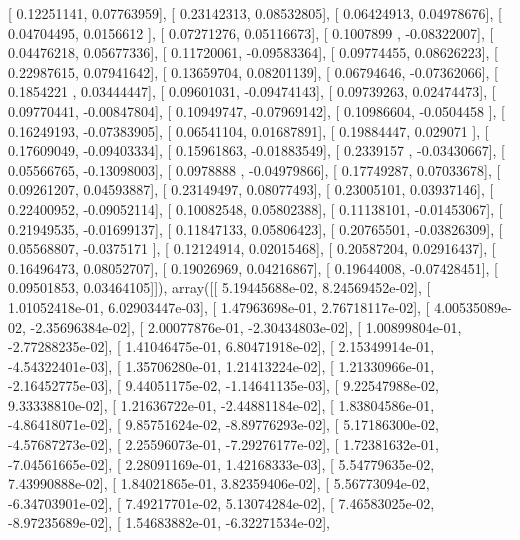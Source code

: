 \documentclass{article}
\begin{document}
       [ 0.12251141,  0.07763959],
       [ 0.23142313,  0.08532805],
       [ 0.06424913,  0.04978676],
       [ 0.04704495,  0.0156612 ],
       [ 0.07271276,  0.05116673],
       [ 0.1007899 , -0.08322007],
       [ 0.04476218,  0.05677336],
       [ 0.11720061, -0.09583364],
       [ 0.09774455,  0.08626223],
       [ 0.22987615,  0.07941642],
       [ 0.13659704,  0.08201139],
       [ 0.06794646, -0.07362066],
       [ 0.1854221 ,  0.03444447],
       [ 0.09601031, -0.09474143],
       [ 0.09739263,  0.02474473],
       [ 0.09770441, -0.00847804],
       [ 0.10949747, -0.07969142],
       [ 0.10986604, -0.0504458 ],
       [ 0.16249193, -0.07383905],
       [ 0.06541104,  0.01687891],
       [ 0.19884447,  0.029071  ],
       [ 0.17609049, -0.09403334],
       [ 0.15961863, -0.01883549],
       [ 0.2339157 , -0.03430667],
       [ 0.05566765, -0.13098003],
       [ 0.0978888 , -0.04979866],
       [ 0.17749287,  0.07033678],
       [ 0.09261207,  0.04593887],
       [ 0.23149497,  0.08077493],
       [ 0.23005101,  0.03937146],
       [ 0.22400952, -0.09052114],
       [ 0.10082548,  0.05802388],
       [ 0.11138101, -0.01453067],
       [ 0.21949535, -0.01699137],
       [ 0.11847133,  0.05806423],
       [ 0.20765501, -0.03826309],
       [ 0.05568807, -0.0375171 ],
       [ 0.12124914,  0.02015468],
       [ 0.20587204,  0.02916437],
       [ 0.16496473,  0.08052707],
       [ 0.19026969,  0.04216867],
       [ 0.19644008, -0.07428451],
       [ 0.09501853,  0.03464105]]), array([[  5.19445688e-02,   8.24569452e-02],
       [  1.01052418e-01,   6.02903447e-03],
       [  1.47963698e-01,   2.76718117e-02],
       [  4.00535089e-02,  -2.35696384e-02],
       [  2.00077876e-01,  -2.30434803e-02],
       [  1.00899804e-01,  -2.77288235e-02],
       [  1.41046475e-01,   6.80471918e-02],
       [  2.15349914e-01,  -4.54322401e-03],
       [  1.35706280e-01,   1.21413224e-02],
       [  1.21330966e-01,  -2.16452775e-03],
       [  9.44051175e-02,  -1.14641135e-03],
       [  9.22547988e-02,   9.33338810e-02],
       [  1.21636722e-01,  -2.44881184e-02],
       [  1.83804586e-01,  -4.86418071e-02],
       [  9.85751624e-02,  -8.89776293e-02],
       [  5.17186300e-02,  -4.57687273e-02],
       [  2.25596073e-01,  -7.29276177e-02],
       [  1.72381632e-01,  -7.04561665e-02],
       [  2.28091169e-01,   1.42168333e-03],
       [  5.54779635e-02,   7.43990888e-02],
       [  1.84021865e-01,   3.82359406e-02],
       [  5.56773094e-02,  -6.34703901e-02],
       [  7.49217701e-02,   5.13074284e-02],
       [  7.46583025e-02,  -8.97235689e-02],
       [  1.54683882e-01,  -6.32271534e-02],
\end{document}
